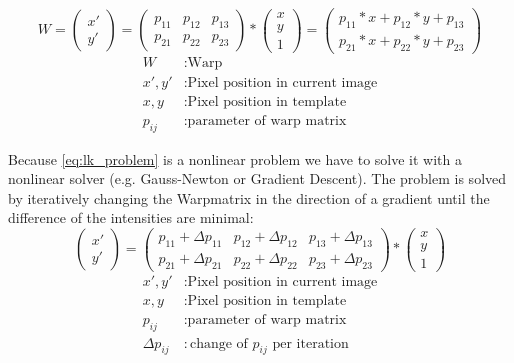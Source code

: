 \documentclass[11pt,a4paper,titlepage,oneside]{report}
\begin{document}
\begin{equation}\label{eq:lk_warped}
	W=
	\begin{pmatrix}
		x' \\
		y'
	\end{pmatrix}=
	\begin{pmatrix}
		p_{11} & p_{12} & p_{13} \\
		p_{21} & p_{22} & p_{23}
	\end{pmatrix}*
	\begin{pmatrix}
		x\\
		y\\
		1
	\end{pmatrix}=
	\begin{pmatrix}
		p_{11}*x + p_{12}*y + p_{13} \\
		p_{21}*x + p_{22}*y + p_{23}
	\end{pmatrix}
\end{equation}
\begin{align*}
	W					&:	\text{Warp}\\
	x',y'			&:	\text{Pixel position in current image}\\
	x,y				&:	\text{Pixel position in template}\\
	p_{ij}		&:	\text{parameter of warp matrix}
\end{align*}

Because \ref{eq:lk_problem} is a nonlinear problem we have to solve it with a nonlinear solver (e.g. Gauss-Newton or Gradient Descent). The problem is solved by iteratively changing the Warpmatrix in the direction of a gradient until the difference of the intensities are minimal:
\begin{equation}
	\begin{pmatrix}
		x' \\
		y'
	\end{pmatrix}=
	\begin{pmatrix}
		p_{11}+\Delta p_{11} & p_{12}+\Delta p_{12} & p_{13}+\Delta p_{13} \\
		p_{21}+\Delta p_{21} & p_{22}+\Delta p_{22} & p_{23}+\Delta p_{23}
	\end{pmatrix}*
	\begin{pmatrix}
		x\\
		y\\
		1
	\end{pmatrix}
\end{equation}
\begin{align*}
	x',y'					&:	\text{Pixel position in current image}\\
	x,y						&:	\text{Pixel position in template}\\
	p_{ij}				&:	\text{parameter of warp matrix}\\
	\Delta p_{ij}	&:	\text{change of $p_{ij}$ per iteration}
\end{align*}
\end{document}
